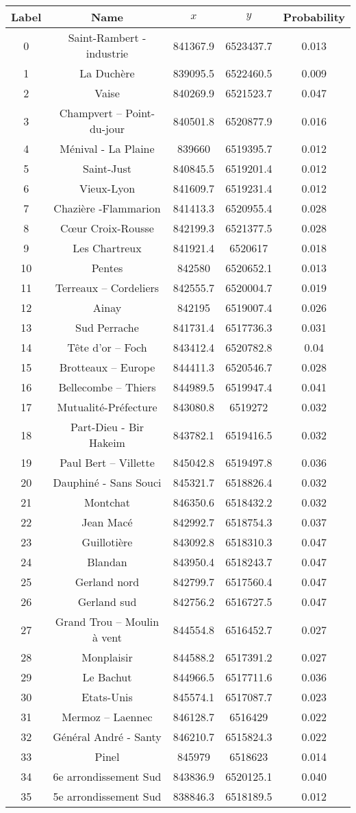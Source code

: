 \documentclass[trsc,reprint]{informs3}
\begin{document}
\begin{APPENDICES}
\begin{table}[h]
\begin{tabular}[c]{|c|c|c|c|c|}
\hline 
Label & Name & $x$ & $y$ & Probability\tabularnewline
\hline 
\hline 
0&Saint-Rambert - industrie&841367.9&6523437.7&0.013\tabularnewline \hline
1&La Duchère&839095.5&6522460.5&0.009\tabularnewline \hline
2&Vaise&840269.9&6521523.7&0.047\tabularnewline \hline
3&Champvert – Point-du-jour&840501.8&6520877.9&0.016\tabularnewline \hline
4&Ménival - La Plaine&839660&6519395.7&0.012\tabularnewline \hline
5&Saint-Just&840845.5&6519201.4&0.012\tabularnewline \hline
6&Vieux-Lyon&841609.7&6519231.4&0.012\tabularnewline \hline
7&Chazière -Flammarion&841413.3&6520955.4&0.028\tabularnewline \hline
8&Cœur Croix-Rousse&842199.3&6521377.5&0.028\tabularnewline \hline
9&Les Chartreux&841921.4&6520617&0.018\tabularnewline \hline
10&Pentes&842580&6520652.1&0.013\tabularnewline \hline
11&Terreaux – Cordeliers&842555.7&6520004.7&0.019\tabularnewline \hline
12&Ainay&842195&6519007.4&0.026\tabularnewline \hline
13&Sud Perrache&841731.4&6517736.3&0.031\tabularnewline \hline
14&Tête d'or – Foch&843412.4&6520782.8&0.04\tabularnewline \hline
15&Brotteaux – Europe&844411.3&6520546.7&0.028\tabularnewline \hline
16&Bellecombe – Thiers&844989.5&6519947.4&0.041\tabularnewline \hline
17&Mutualité-Préfecture&843080.8&6519272&0.032\tabularnewline \hline
18&Part-Dieu - Bir Hakeim&843782.1&6519416.5&0.032\tabularnewline \hline
19&Paul Bert – Villette&845042.8&6519497.8&0.036\tabularnewline \hline
20&Dauphiné - Sans Souci&845321.7&6518826.4&0.032\tabularnewline \hline
21&Montchat &846350.6&6518432.2&0.032\tabularnewline \hline
22&Jean Macé&842992.7&6518754.3&0.037\tabularnewline \hline
23&Guillotière&843092.8&6518310.3&0.047\tabularnewline \hline
24&Blandan&843950.4&6518243.7&0.047\tabularnewline \hline
25&Gerland nord&842799.7&6517560.4&0.047\tabularnewline \hline
26&Gerland sud&842756.2&6516727.5&0.047\tabularnewline \hline
27&Grand Trou – Moulin à vent&844554.8&6516452.7&0.027\tabularnewline \hline
28&Monplaisir&844588.2&6517391.2&0.027\tabularnewline \hline
29&Le Bachut&844966.5&6517711.6&0.036\tabularnewline \hline
30&Etats-Unis&845574.1&6517087.7&0.023\tabularnewline \hline
31&Mermoz – Laennec&846128.7&6516429&0.022\tabularnewline \hline
32&Général André -  Santy&846210.7&6515824.3&0.022\tabularnewline \hline
33&Pinel&845979&6518623&0.014\tabularnewline \hline
34&6e arrondissement Sud&843836.9&6520125.1&0.040\tabularnewline \hline
35&5e arrondissement Sud&838846.3&6518189.5&0.012\tabularnewline \hline
\end{tabular}



\end{table}
\end{APPENDICES}
\end{document}
